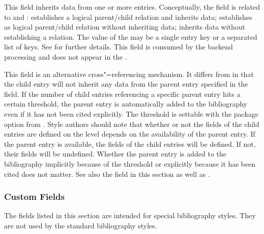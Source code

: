 \documentclass{ltxdockit}[2011/03/25]
\begin{document}
\begin{fieldlist}

This field inherits data from one or more  entries. Conceptually, the  field is related to  and :  establishes a logical parent/child relation and inherits data;  establishes as logical parent/child relation without inheriting data;  inherits data without establishing a relation. The value of the  may be a single entry key or a separated list of keys. See  for further details. This field is consumed by the backend processing and does not appear in the .


This field is an alternative cross"=referencing mechanism. It differs from  in that the child entry will not inherit any data from the parent entry specified in the  field. If the number of child entries referencing a specific parent entry hits a certain threshold, the parent entry is automatically added to the bibliography even if it has not been cited explicitly. The threshold is settable with the  package option from . Style authors should note that whether or not the  fields of the child entries are defined on the  level depends on the availability of the parent entry. If the parent entry is available, the  fields of the child entries will be defined. If not, their  fields will be undefined. Whether the parent entry is added to the bibliography implicitly because of the threshold or explicitly because it has been cited does not matter. See also the  field in this section as well as .

\end{fieldlist}

\subsubsection{Custom Fields}
\label{bib:fld:ctm}

The fields listed in this section are intended for special bibliography styles. They are not used by the standard bibliography styles.
\end{document}
